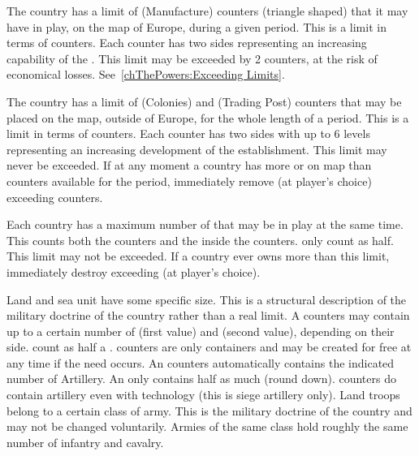 \aparag[Manufactures] The country has a limit of \MNU (Manufacture) counters
(triangle shaped) that it may have in play, on the map of Europe, during a
given period.
\bparag This is a limit in terms of counters. Each counter has two sides
representing an increasing capability of the \MNU.
\bparag This limit may be exceeded by 2 counters, at the risk of economical
losses. See~\ref{chThePowers:Exceeding Limits}.

 The country has a limit of \COL (Colonies)
and \TP (Trading Post) counters that may be placed on the map, outside of
Europe, for the whole length of a period.
\bparag This is a limit in terms of counters. Each counter has two sides with
up to 6 levels representing an increasing development of the establishment.
\bparag This limit may never be exceeded. If at any moment a country has more
\COL or \TP on map than counters available for the period, %
immediately remove (at player's choice) exceeding counters.

\aparag[Fleet] Each country has a maximum number of \ND that may be in play at
the same time.
\bparag This counts both the \ND counters and the \ND inside the \FLEET
counters.
\bparag \NGD only count as half.
\bparag This limit may not be exceeded. If a country ever owns more \ND than
this limit, %
immediately destroy exceeding \ND (at player's choice).

 Land and sea unit have some specific size. This is a
structural description of the military doctrine of the country rather than a
real limit.
\bparag A \FLEET counters may contain up to a certain number of \ND (first
value) and \NTD (second value), depending on their side. \NGD count as half a
\ND. \FLEET counters are only containers and may be created for free at any
time if the need occurs.
\bparag An \ARMY\faceplus counters automatically contains the indicated number
of Artillery. An \ARMY\facemoins only contains half as much (round
down). \ARMY counters do contain artillery even with 
technology (this is siege artillery only).
\bparag Land troops belong to a certain class of army. This is the military
doctrine of the country and may not be changed voluntarily. Armies of the same
class hold roughly the same number of infantry and cavalry.

